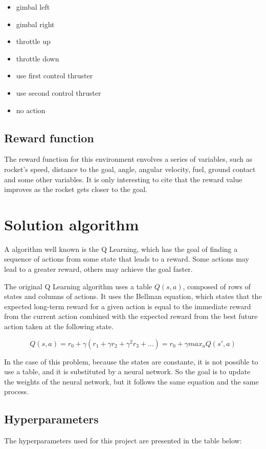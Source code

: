 \documentclass{article}
\begin{document}
\begin{itemize}
	\item gimbal left
    \item gimbal right
    \item throttle up
    \item throttle down
    \item use first control thruster
    \item use second control thruster
    \item no action
\end{itemize}

\subsection{Reward function}
The reward function for this environment envolves a series of variables, such as rocket's speed, distance to the goal, angle, angular velocity, fuel, ground contact and some other variables. It is only interesting to cite that the reward value improves as the rocket gets closer to the goal.

\section{Solution algorithm}
A algorithm well known is the Q Learning, which has the goal of finding a sequence of actions from some state that leads to a reward. Some actions may lead to a greater reward, others may achieve the goal faster.

The original Q Learning algorithm uses a table $Q(s,a)$, composed of rows of states and columns of actions. It uses the Bellman equation, which states that the expected long-term reward for a given action is equal to the immediate reward from the current action combined with the expected reward from the best future action taken at the following state.

\[Q(s,a)=r_0+\gamma(r_1+\gamma r_2+\gamma^2 r_3+...)=r_0+\gamma max_a Q(s',a)\]

In the case of this problem, because the states are constante, it is not possible to use a table, and it is substituted by a neural network. So the goal is to update the weights of the neural network, but it follows the same equation and the same process.

\subsection{Hyperparameters}
The hyperparameters used for this project are presented in the table below:
\end{document}
